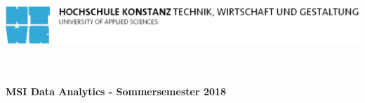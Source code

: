 
\begin{titlepage}
\vspace*{-2.7cm}

\begin{flushleft}
\hspace*{-1cm} \includegraphics[width=15.7cm]{htwg-logo.pdf}
\end{flushleft}

\vspace{3.5cm}

\begin{center}
	\huge{
		\textbf{\thema} \\[5cm]
	}
	\Large{
		\textbf{\autor} \\[2cm]	
	}
	\normalsize{
		\textbf{MSI Data Analytics - Sommersemester 2018}
	}

	
\end{center}

\end{titlepage}
